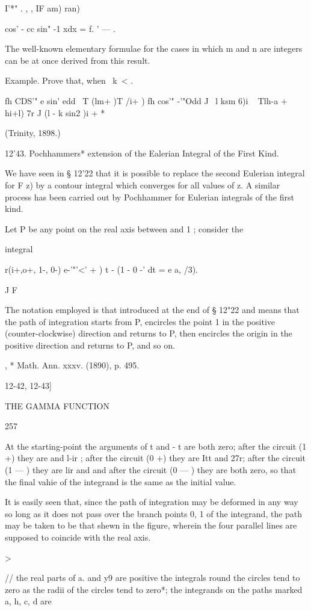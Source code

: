I'*" . , , IF am) ran)

cos' - cc sin" -1 xdx = f. ' — .

The well-known elementary formulae for the cases in which m and n are
integers can be at once derived from this result.

Example. Prove that, when \ k\ < .\,

fh CDS'" e sin' edd \ T (lm+ )T /i+ ) fh cos'" -'"Odd J \ l ksm 6)i ~
Tlh-a + hi+l) 7r J (l - k sin2 )i + *

(Trinity, 1898.)

12'43. Pochhammers* extension of the Ealerian Integral of the First
Kind.

We have seen in § 12'22 that it is possible to replace the second
Eulerian integral for F z) by a contour integral which converges for
all values of z. A similar process has been carried out by Pochhammer
for Eulerian integrals of the first kind.

Let P be any point on the real axis between and 1 ; consider the

integral

r(i+,o+, 1-, 0-) e-'"'<' + ) t - (1 - 0 -' dt = e a, /3).

J F

The notation employed is that introduced at the end of § 12"22 and
means that the path of integration starts from P, encircles the point
1 in the positive (counter-clockwise) direction and returns to P, then
encircles the origin in the positive direction and returns to P, and
so on.

, * Math. Ann. xxxv. (1890), p. 495.

12-42, 12-43]

THE GAMMA FUNCTION

257

At the starting-point the arguments of t and - t are both zero; after
the circuit (1 +) they are and l-ir ; after the circuit (0 +) they are
Itt and 27r; after the circuit (1 — ) they are lir and and after the
circuit (0 — ) they are both zero, so that the final vahie of the
integrand is the same as the initial value.

It is easily seen that, since the path of integration may be deformed
in any way so long as it does not pass over the branch points 0, 1 of
the integrand, the path may be taken to be that shewn in the figure,
wherein the four parallel lines are supposed to coincide with the real
axis.

>

// the real parts of a. and y9 are positive the integrals round the
circles tend to zero as the radii of the circles tend to zero*; the
integrands on the paths marked a, h, c, d are


